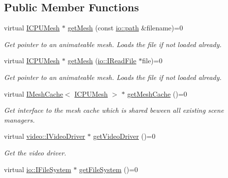 \subsection*{Public Member Functions}
\begin{DoxyCompactItemize}
\item 
virtual \hyperlink{classirr_1_1scene_1_1IMesh}{I\+C\+P\+U\+Mesh} $\ast$ \hyperlink{classirr_1_1scene_1_1ISceneManager_aca1b12117220849983243ee2f73a8f4d}{get\+Mesh} (const \hyperlink{namespaceirr_1_1io_ab1bdc45edb3f94d8319c02bc0f840ee1}{io\+::path} \&filename)=0
\begin{DoxyCompactList}\small\item\em Get pointer to an animateable mesh. Loads the file if not loaded already. \end{DoxyCompactList}\item 
virtual \hyperlink{classirr_1_1scene_1_1IMesh}{I\+C\+P\+U\+Mesh} $\ast$ \hyperlink{classirr_1_1scene_1_1ISceneManager_a733c4e8040702ec9fe486ee15a5089a6}{get\+Mesh} (\hyperlink{classirr_1_1io_1_1IReadFile}{io\+::\+I\+Read\+File} $\ast$file)=0
\begin{DoxyCompactList}\small\item\em Get pointer to an animateable mesh. Loads the file if not loaded already. \end{DoxyCompactList}\item 
virtual \hyperlink{classirr_1_1scene_1_1IMeshCache}{I\+Mesh\+Cache}$<$ \hyperlink{classirr_1_1scene_1_1IMesh}{I\+C\+P\+U\+Mesh} $>$ $\ast$ \hyperlink{classirr_1_1scene_1_1ISceneManager_ac5ffbb676d3c68becfb565cf72e2afa0}{get\+Mesh\+Cache} ()=0
\begin{DoxyCompactList}\small\item\em Get interface to the mesh cache which is shared beween all existing scene managers. \end{DoxyCompactList}\item 
virtual \hyperlink{classirr_1_1video_1_1IVideoDriver}{video\+::\+I\+Video\+Driver} $\ast$ \hyperlink{classirr_1_1scene_1_1ISceneManager_afde082160205a8faab44cd5b61e3745c}{get\+Video\+Driver} ()=0
\begin{DoxyCompactList}\small\item\em Get the video driver. \end{DoxyCompactList}\item 
virtual \hyperlink{classirr_1_1io_1_1IFileSystem}{io\+::\+I\+File\+System} $\ast$ \hyperlink{classirr_1_1scene_1_1ISceneManager_adbd98fbeba199005cf795a5bae7ccbaf}{get\+File\+System} ()=0

\end{DoxyCompactItemize}
